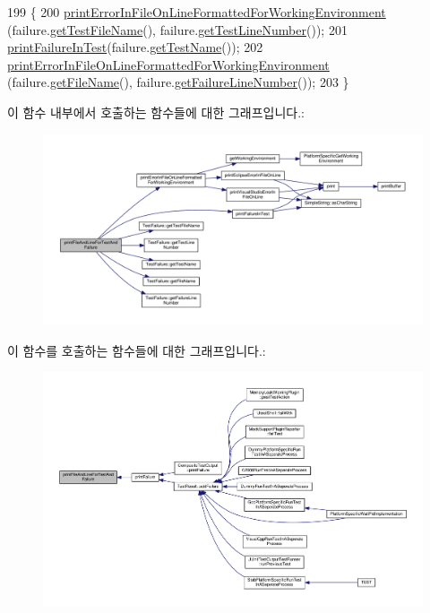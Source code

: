 \begin{DoxyCode}
199 \{
200     \hyperlink{class_test_output_a56ae5964123fc91c7149a8274aa22db9}{printErrorInFileOnLineFormattedForWorkingEnvironment}
      (failure.\hyperlink{class_test_failure_a2fb8d164bb0730492e0140ec8080f13f}{getTestFileName}(), failure.\hyperlink{class_test_failure_a9fd9b831dfada83bbc2a1847918080a6}{getTestLineNumber}());
201     \hyperlink{class_test_output_a1748d410d65b95596df95234742258a3}{printFailureInTest}(failure.\hyperlink{class_test_failure_a02da3865d8c38e5fd122a08a5e23773e}{getTestName}());
202     \hyperlink{class_test_output_a56ae5964123fc91c7149a8274aa22db9}{printErrorInFileOnLineFormattedForWorkingEnvironment}
      (failure.\hyperlink{class_test_failure_ac74fa65c497d9a175304a14ffafcaa1a}{getFileName}(), failure.\hyperlink{class_test_failure_a9d41f8ad9667ed1f471676d49a655ec7}{getFailureLineNumber}());
203 \}
\end{DoxyCode}


이 함수 내부에서 호출하는 함수들에 대한 그래프입니다.\+:
\nopagebreak
\begin{figure}[H]
\begin{center}
\leavevmode
\includegraphics[width=350pt]{class_test_output_ae20c439e68036cc705a86d9a95954168_cgraph}
\end{center}
\end{figure}




이 함수를 호출하는 함수들에 대한 그래프입니다.\+:
\nopagebreak
\begin{figure}[H]
\begin{center}
\leavevmode
\includegraphics[width=350pt]{class_test_output_ae20c439e68036cc705a86d9a95954168_icgraph}
\end{center}
\end{figure}


